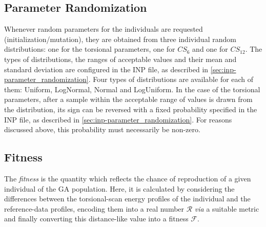 \documentclass[10pt,a4paper,openany]{memoir}
\numberwithin{equation}{section}
\begin{document}
\subsection{Parameter Randomization}
\label{sec:ga-parameter-randomization}

Whenever random parameters for the individuals are requested
(initialization/mutation), they are obtained from three individual
random distributions: one for the torsional parameters, one for $CS_6$
and one for $CS_{12}$. The types of distributions, the ranges of
acceptable values and their mean and standard deviation are configured
in the INP file, as described in
\autoref{sec:inp-parameter_randomization}.  Four types of
distributions are available for each of them: Uniform, LogNormal,
Normal and LogUniform. In the case of the torsional parameters, after
a sample within the acceptable range of values is drawn from the
distribution, its sign can be reversed with a fixed probability
specified in the INP file, as described in
\autoref{sec:inp-parameter_randomization}. For reasons discussed
above, this probability must necessarily be non-zero.

\subsection{Fitness}
\label{sec:ga-fitness}

The \textit{fitness} is the quantity which reflects the chance of
reproduction of a given individual of the GA population.  Here, it is
calculated by considering the differences between the torsional-scan
energy profiles of the individual and the reference-data profiles,
encoding them into a real number $\mathcal{R}$ \textit{via} a suitable
metric and finally converting this distance-like value into a fitness
$\mathcal{F}$.
\end{document}
